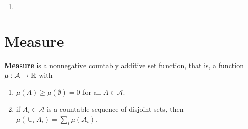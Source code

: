 \begin{example}
	\begin{enumerate}
		\item
	\end{enumerate}
\end{example}

\section{Measure}

\begin{definition}[Measure]
	\textbf{Measure} is a nonnegative countably additive set function, that is, a function \(\mu:\mathcal{A}\rightarrow\mathbb{R}\) with
	\begin{enumerate}
		\item \(\mu(A)\geq\mu(\emptyset)=0\) for all \(A\in\mathcal{A}\).
		\item if \(A_i\in\mathcal{A}\) is a countable sequence of disjoint sets, then \(\mu(\cup_{i}A_{i})=\sum_i\mu(A_i)\).
	\end{enumerate}
\end{definition}



